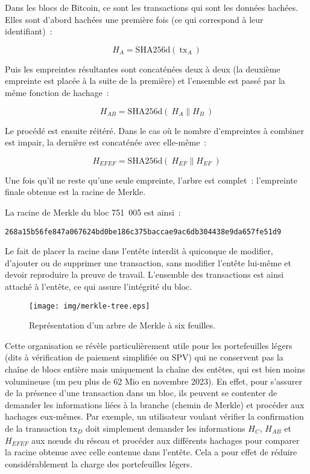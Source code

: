 Dans les blocs de Bitcoin, ce sont les transactions qui sont les données hachées. Elles sont d'abord hachées une première fois (ce qui correspond à leur identifiant)~:

{ \small
\[
H_A = \mathrm{SHA256d}(~\mathrm{tx}_A~)
\]
}

Puis les empreintes résultantes sont concaténées deux à deux (la deuxième empreinte est placée à la suite de la première) et l'ensemble est passé par la même fonction de hachage~:

{ \small
\[
H_{A\!B} = \mathrm{SHA256d}(~H_A \parallel H_B~)
\]
}

Le procédé est ensuite réitéré. Dans le cas où le nombre d'empreintes à combiner est impair, la dernière est concaténée avec elle-même~:

{ \small
\[
H_{E\!F\!E\!F} = \mathrm{SHA256d}(~H_{E\!F} \parallel H_{E\!F}~)
\]
}

Une fois qu'il ne reste qu'une seule empreinte, l'arbre est complet~: l'empreinte finale obtenue est la racine de Merkle.

La racine de Merkle du bloc 751~005 est ainsi~:

\begin{Verbatim}[fontsize=\footnotesize]
268a15b56fe847a067624bd0be186c375baccae9ac6db304438e9da657fe51d9
\end{Verbatim}

Le fait de placer la racine dans l'entête interdit à quiconque de modifier, d'ajouter ou de supprimer une transaction, sans modifier l'entête lui-même et devoir reproduire la preuve de travail. L'ensemble des transactions est ainsi attaché à l'entête, ce qui assure l'intégrité du bloc.

\begin{figure}[h]
  \centering
  \texttt{[image: img/merkle-tree.eps]}
  \caption{Représentation d'un arbre de Merkle à six feuilles.}
  \label{fig:merkle-tree}
\end{figure}

Cette organisation se révèle particulièrement utile pour les portefeuilles légers (dits à vérification de paiement simplifiée ou SPV) qui ne conservent pas la chaîne de blocs entière mais uniquement la chaîne des entêtes, qui est bien moins volumineuse (un peu plus de 62 Mio en novembre 2023). En effet, pour s'assurer de la présence d'une transaction dans un bloc, ils peuvent se contenter de demander les informations liées à la branche (chemin de Merkle) et procéder aux hachages eux-mêmes. Par exemple, un utilisateur voulant vérifier la confirmation de la transaction $\mathrm{tx}_D$ doit simplement demander les informations $H_C$, $H_{A\!B}$ et $H_{E\!F\!E\!F}$ aux nœuds du réseau et procéder aux différents hachages pour comparer la racine obtenue avec celle contenue dans l'entête. Cela a pour effet de réduire considérablement la charge des portefeuilles légers.

